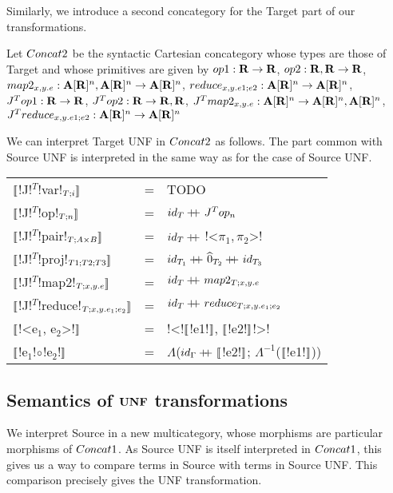 Similarly, we introduce a second concategory for the Target part of our transformations.

\begin{definition}[$\ConcatT$]
Let $\ConcatT$ be the syntactic Cartesian concategory whose types are those of Target and 
whose primitives are given by 
$op1: \mathbf{R} \to \mathbf{R}$, 
$op2: \mathbf{R},\mathbf{R} \to \mathbf{R}$, 
$map2_{x,y.e}: \mathbf{A}[\mathbf{R}]^{n},\mathbf{A}[\mathbf{R}]^{n}\to \mathbf{A}[\mathbf{R}]^{n}$, 
$reduce_{x,y.e1;e2}: \mathbf{A}[\mathbf{R}]^{n} \to \mathbf{A}[\mathbf{R}]^{n}$, 
$J^Top1: \mathbf{R} \to \mathbf{R}$, 
$J^Top2: \mathbf{R} \to \mathbf{R}, \mathbf{R}$, 
$J^Tmap2_{x,y.e}: \mathbf{A}[\mathbf{R}]^{n} \to \mathbf{A}[\mathbf{R}]^{n}, \mathbf{A}[\mathbf{R}]^{n}$, 
$J^Treduce_{x,y.e1;e2}: \mathbf{A}[\mathbf{R}]^{n} \to \mathbf{A}[\mathbf{R}]^{n}$ 
\end{definition}

We can interpret Target UNF in $\ConcatT$ as follows. 
The part common with Source UNF is interpreted in the same way as for the case of Source UNF.

\begin{tabular}{l c l}
    $\llbracket$!J!$^T$!var!$_{T;i} \rrbracket$ &=& TODO \\
    $\llbracket$!J!$^T$!op!$_{T;n} \rrbracket$ &=& $id_T+\kern-1.3ex+\kern0.8ex J^Top_n$ \\
    $\llbracket$!J!$^T$!pair!$_{T;A\times B} \rrbracket$ &=& $id_T+\kern-1.3ex+\kern0.8ex$!<$\pi_1,\pi_2$>! \\
    $\llbracket$!J!$^T$!proj!$_{T1;T2;T3} \rrbracket$ &=& $id_{T_1}+\kern-1.3ex+\kern0.8ex\widehat{0}_{T_2}+\kern-1.3ex+\kern0.8ex id_{T_3}$ \\
    $\llbracket$!J!$^T$!map2!$_{T;x,y.e}\rrbracket$  &=& $id_T+\kern-1.3ex+\kern0.8ex map2_{T;x,y.e}$ \\
    $\llbracket$!J!$^T$!reduce!$_{T;x,y.e_1;e_2}\rrbracket$  &=& $id_T+\kern-1.3ex+\kern0.8ex reduce_{T;x,y.e_1;e_2}$ \\
    $\llbracket$!<e$_1$, e$_2$>!$\rrbracket$  &=& !<!$\llbracket$!e1!$\rrbracket$, $\llbracket$!e2!$\rrbracket$!>! \\
    $\llbracket$!e$_1$!$\circ$!e$_2$!$\rrbracket$ &=& $\Lambda$($id_\Gamma+\kern-1.3ex+\kern0.8ex\llbracket$!e2!$\rrbracket$; $\Lambda^{-1}$($\llbracket$!e1!$\rrbracket$)) \\
 \end{tabular}

\subsection{Semantics of $\mathbf{UNF}$ transformations} %
\label{sub:Semantics for UNF transformations}

We interpret Source in a new multicategory, 
whose morphisms are particular morphisms of $Concat1$.
As Source UNF is itself interpreted in $Concat1$, 
this gives us a way to compare terms in Source with terms in Source UNF.
This comparison precisely gives the UNF transformation.

